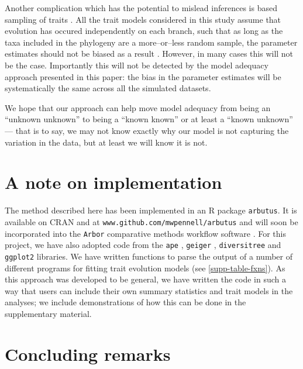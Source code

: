\documentclass[12pt]{article}
\begin{document}
Another complication which has the potential to mislead inferences is based sampling of traits \citep{Freckletoninaction, longeuroname, FitzJohnwoody}. All the trait models considered in this study assume that evolution has occured independently on each branch, such that as long as the taxa included in the phylogeny are a more--or--less random sample, the parameter estimates should not be biased as a result \citep{PennellHarmon}. However, in many cases \citep[especially when using large trait databases][]{FitzJohnwoody} this will not be the case. Importantly this will not be detected by the model adequacy approach presented in this paper: the bias in the parameter estimates will be systematically the same across all the simulated datasets.

We hope that our approach can help move model adequacy from being an ``unknown unknown''  to being a ``known known'' or at least a ``known unknown'' --- that is to say, we may not know exactly why our model is not capturing the variation in the data, but at least we will know it is not.


\section*{A note on implementation}

The method described here has been implemented in an R package \texttt{arbutus}. It is available on CRAN and at \texttt{www.github.com/mwpennell/arbutus} and will soon be incorporated into the \texttt{Arbor} comparative methods workflow software \citep{Arbor}. For this project, we have also adopted code from the \texttt{ape} \citep{ape}, \texttt{geiger} \citep{geiger}, \texttt{diversitree} \citep{FitzJohn2012} and \texttt{ggplot2} \citep{ggplot2} libraries. We have written functions to parse the output of a number of different programs for fitting trait evolution models (see \ref{supp-table-fxns}). As this approach was developed to be general, we have written the code in such a way that users can include their own summary statistics and trait models in the analyses; we include demonstrations of how this can be done in the supplementary material.

\section*{Concluding remarks}
\end{document}
